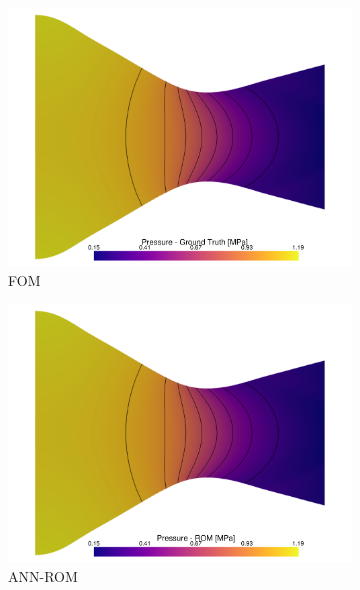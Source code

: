 \documentclass[tg, EN]{ufabcFHZh_tg}
\begin{document}
\begin{figure}[H]
    \centering
    \begin{subfigure}[b]{0.32\textwidth}
        \centering
        \includegraphics[width=\textwidth]{Figuras/nn_ground_truth_pressure.pdf}
        \caption{FOM}
    \end{subfigure}
    \hfill
    \begin{subfigure}[b]{0.32\textwidth}
        \centering
        \includegraphics[width=\textwidth]{Figuras/nn_prediction_pressure.pdf}
        \caption{ANN-ROM}
    \end{subfigure}
    \hfill
    \begin{subfigure}[b]{0.32\textwidth}
        \centering

\end{subfigure}
\end{figure}
\end{document}
